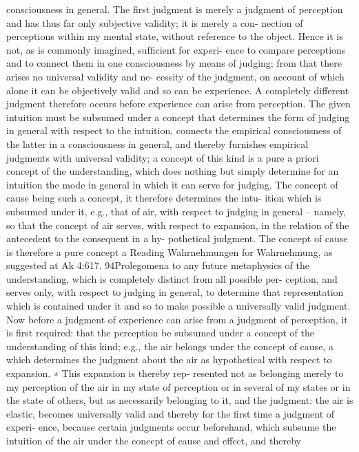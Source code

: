 consciousness in general. The ﬁrst judgment is merely a judgment of
perception and has thus far only subjective validity; it is merely a con-
nection of perceptions within my mental state, without reference to the
object. Hence it is not, as is commonly imagined, sufﬁcient for experi-
ence to compare perceptions and to connect them in one consciousness
by means of judging; from that there arises no universal validity and ne-
cessity of the judgment, on account of which alone it can be objectively
valid and so can be experience.
A completely different judgment therefore occurs before experience
can arise from perception. The given intuition must be subsumed under
a concept that determines the form of judging in general with respect
to the intuition, connects the empirical consciousness of the latter in
a consciousness in general, and thereby furnishes empirical judgments
with universal validity; a concept of this kind is a pure a priori concept
of the understanding, which does nothing but simply determine for an
intuition the mode in general in which it can serve for judging. The
concept of cause being such a concept, it therefore determines the intu-
ition which is subsumed under it, e.g., that of air, with respect to judging
in general – namely, so that the concept of air serves, with respect to
expansion, in the relation of the antecedent to the consequent in a hy-
pothetical judgment. The concept of cause is therefore a pure concept
a
Reading Wahrnehmungen for Wahrnehmung, as suggested at Ak 4:617.
94Prolegomena to any future metaphysics
of the understanding, which is completely distinct from all possible per-
ception, and serves only, with respect to judging in general, to determine
that representation which is contained under it and so to make possible
a universally valid judgment.
Now before a judgment of experience can arise from a judgment of
perception, it is ﬁrst required: that the perception be subsumed under
a concept of the understanding of this kind; e.g., the air belongs under
the concept of cause, a which determines the judgment about the air as
hypothetical with respect to expansion. ∗ This expansion is thereby rep-
resented not as belonging merely to my perception of the air in my state
of perception or in several of my states or in the state of others, but as
necessarily belonging to it, and the judgment: the air is elastic, becomes
universally valid and thereby for the ﬁrst time a judgment of experi-
ence, because certain judgments occur beforehand, which subsume the
intuition of the air under the concept of cause and effect, and thereby
